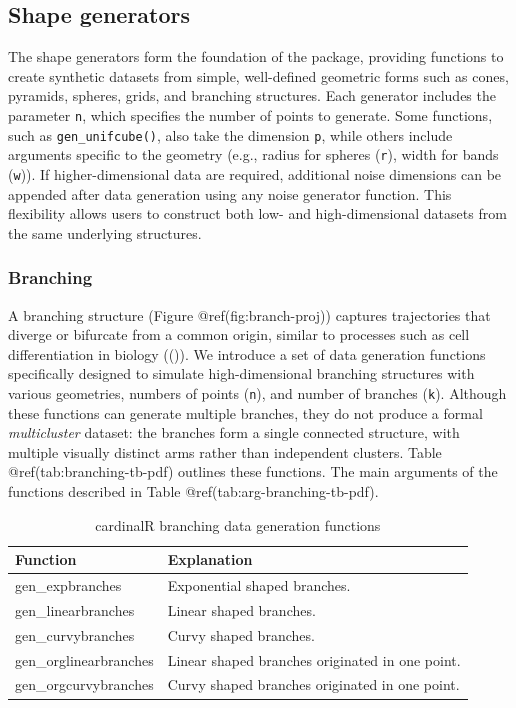 \documentclass[
  11pt,
  a4paper,
]{report}
\begin{document}
\subsection{Shape generators}\label{shape-generators}

The shape generators form the foundation of the package, providing
functions to create synthetic datasets from simple, well-defined
geometric forms such as cones, pyramids, spheres, grids, and branching
structures. Each generator includes the parameter \texttt{n}, which
specifies the number of points to generate. Some functions, such as
\texttt{gen\_unifcube()}, also take the dimension \texttt{p}, while
others include arguments specific to the geometry (e.g., radius for
spheres (\texttt{r}), width for bands (\texttt{w})). If
higher-dimensional data are required, additional noise dimensions can be
appended after data generation using any noise generator function. This
flexibility allows users to construct both low- and high-dimensional
datasets from the same underlying structures.

\subsubsection{Branching}\label{branching}

A branching structure (Figure @ref(fig:branch-proj)) captures
trajectories that diverge or bifurcate from a common origin, similar to
processes such as cell differentiation in biology
(()). We introduce a
set of data generation functions specifically designed to simulate
high-dimensional branching structures with various geometries, numbers
of points (\texttt{n}), and number of branches (\texttt{k}). Although
these functions can generate multiple branches, they do not produce a
formal \emph{multicluster} dataset: the branches form a single connected
structure, with multiple visually distinct arms rather than independent
clusters. Table @ref(tab:branching-tb-pdf) outlines these functions. The
main arguments of the functions described in Table
@ref(tab:arg-branching-tb-pdf).

\begin{table}

\caption{\label{tab:branching-tb-pdf}cardinalR branching data generation functions}
\centering
\begin{tabular}[t]{>{\raggedright\arraybackslash}p{4cm}>{\raggedright\arraybackslash}p{8cm}}
\toprule
Function & Explanation\\
\midrule
gen\_expbranches & Exponential shaped branches.\\
gen\_linearbranches & Linear shaped branches.\\
gen\_curvybranches & Curvy shaped branches.\\
gen\_orglinearbranches & Linear shaped branches originated in one point.\\
gen\_orgcurvybranches & Curvy shaped branches originated in one point.\\
\bottomrule
\end{tabular}
\end{table}
\end{document}
